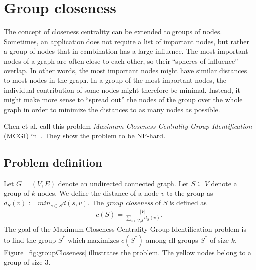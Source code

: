 \chapter{Group closeness}
\label{ch:groupCloseness}

The concept of closeness centrality can be extended to groups of nodes. Sometimes, an application does not require a list of important nodes, but rather a group of nodes that in combination has a large influence. The most important nodes of a graph are often close to each other, so their ``spheres of influence'' overlap. In other words, the most important nodes might have similar distances to most nodes in the graph. In a group of the most important nodes, the individual contribution of some nodes might therefore be minimal. Instead, it might make more sense to ``spread out'' the nodes of the group over the whole graph in order to minimize the distances to as many nodes as possible.

Chen et al. call this problem \emph{Maximum Closeness Centrality Group Identification} (MCGI) in~\cite{Chen2016}. They show the problem to be NP-hard.

\section{Problem definition}

Let $G = (V, E)$ denote an undirected connected graph. Let $S \subseteq V$ denote a group of $k$ nodes. We define the distance of a node $v$ to the group as $d_S(v) := min_{s \in S}d(s, v)$. The \emph{group closeness} of $S$ is defined as
\begin{align}
	c(S) = \frac{|V|}{\sum_{v \in V \setminus S}{d_S(v)}}.
\end{align}
The goal of the Maximum Closeness Centrality Group Identification problem is to find the group $S^*$ which maximizes $c(S^*)$ among all groups $S^*$ of size $k$.
Figure~\ref{fig:groupCloseness} illustrates the problem. The yellow nodes belong to a group of size $3$.

